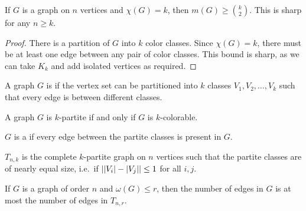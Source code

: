 \begin{theorem}
  If $G$ is a graph on $n$ vertices and $\chi(G) = k$, then $m(G) \ge
  \binom{k}{2}$.
  This is sharp for any $n \ge k$.
\end{theorem}

\begin{proof}
  There is a partition of $G$ into $k$ color classes.
  Since $\chi(G) = k$, there must be at least one edge between any pair of color
  classes.
  This bound is sharp, as we can take $K_k$ and add isolated vertices as
  required.
\end{proof}


\begin{definition}
  A graph $G$ is  if the vertex set can be partitioned into
  $k$ classes $V_1, V_2, \ldots, V_k$ such that every edge is between different
  classes.
\end{definition}

\begin{remark}
  A graph $G$ is $k$-partite if and only if $G$ is $k$-colorable.
\end{remark}

\begin{definition}
  $G$ is a  if every edge between the partite
  classes is present in $G$.
\end{definition}

\begin{definition}
   $T_{n,k}$ is the complete $k$-partite graph on $n$
  vertices such that the partite classes are of nearly equal size, i.e.~if
  $\left| \left| V_i \right| - \left| V_j \right| \right| \le 1$ for all $i, j$.
\end{definition}

\begin{theorem}[Turàn]
  If $G$ is a graph of order $n$ and $\omega(G) \le r$, then the number of edges
  in $G$ is at most the number of edges in $T_{n,r}$.
\end{theorem}

